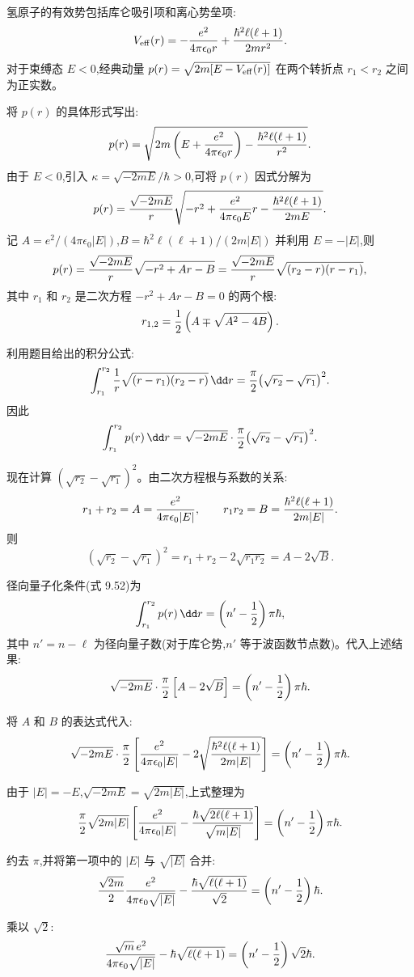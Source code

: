 \begin{solution}
氢原子的有效势包括库仑吸引项和离心势垒项:
\[
V_{\rm eff}(r)=-{e^2\over4\pi\epsilon_0 r}+{\hbar^2\ell(\ell+1)\over2mr^2}.
\]
对于束缚态 $E<0$,经典动量 $p(r)=\sqrt{2m[E-V_{\rm eff}(r)]}$ 在两个转折点 $r_1<r_2$ 之间为正实数。

将 $p(r)$ 的具体形式写出:
\[
p(r)=\sqrt{2m\left(E+{e^2\over4\pi\epsilon_0 r}\right)-{\hbar^2\ell(\ell+1)\over r^2}}.
\]
由于 $E<0$,引入 $\kappa=\sqrt{-2mE}/\hbar>0$,可将 $p(r)$ 因式分解为
\[
p(r)={\sqrt{-2mE}\over r}\sqrt{-r^2+{e^2\over4\pi\epsilon_0 E}r
-{\hbar^2\ell(\ell+1)\over2mE}}.
\]
记 $A={e^2/(4\pi\epsilon_0|E|)}$,$B={\hbar^2\ell(\ell+1)/(2m|E|)}$ 并利用 $E=-|E|$,则
\[
p(r)={\sqrt{-2mE}\over r}\sqrt{-r^2+Ar-B}
={\sqrt{-2mE}\over r}\sqrt{(r_2-r)(r-r_1)},
\]
其中 $r_1$ 和 $r_2$ 是二次方程 $-r^2+Ar-B=0$ 的两个根:
\[
r_{1,2}={1\over2}\left(A\mp\sqrt{A^2-4B}\right).
\]

利用题目给出的积分公式:
\[
\int_{r_1}^{r_2}{1\over r}\sqrt{(r-r_1)(r_2-r)}\,\dd r
={\pi\over2}\bigl(\sqrt{r_2}-\sqrt{r_1}\bigr)^2.
\]
因此
\[
\int_{r_1}^{r_2}p(r)\,\dd r
=\sqrt{-2mE}\cdot{\pi\over2}\bigl(\sqrt{r_2}-\sqrt{r_1}\bigr)^2.
\]

现在计算 $(\sqrt{r_2}-\sqrt{r_1})^2$。由二次方程根与系数的关系:
\[
r_1+r_2=A={e^2\over4\pi\epsilon_0|E|},\qquad
r_1r_2=B={\hbar^2\ell(\ell+1)\over2m|E|}.
\]
则
\[
(\sqrt{r_2}-\sqrt{r_1})^2=r_1+r_2-2\sqrt{r_1r_2}
=A-2\sqrt{B}.
\]

径向量子化条件(式 9.52)为
\[
\int_{r_1}^{r_2}p(r)\,\dd r=\left(n'-{1\over2}\right)\pi\hbar,
\]
其中 $n'=n-\ell$ 为径向量子数(对于库仑势,$n'$ 等于波函数节点数)。代入上述结果:
\[
\sqrt{-2mE}\cdot{\pi\over2}\left[A-2\sqrt{B}\right]
=\left(n'-{1\over2}\right)\pi\hbar.
\]

将 $A$ 和 $B$ 的表达式代入:
\[
\sqrt{-2mE}\cdot{\pi\over2}
\left[{e^2\over4\pi\epsilon_0|E|}-2\sqrt{\hbar^2\ell(\ell+1)\over2m|E|}\right]
=\left(n'-{1\over2}\right)\pi\hbar.
\]

由于 $|E|=-E$,$\sqrt{-2mE}=\sqrt{2m|E|}$,上式整理为
\[
{\pi\over2}\sqrt{2m|E|}
\left[{e^2\over4\pi\epsilon_0|E|}-{\hbar\sqrt{2\ell(\ell+1)}\over\sqrt{m|E|}}\right]
=\left(n'-{1\over2}\right)\pi\hbar.
\]

约去 $\pi$,并将第一项中的 $|E|$ 与 $\sqrt{|E|}$ 合并:
\[
{\sqrt{2m}\over2}{e^2\over4\pi\epsilon_0\sqrt{|E|}}
-{\hbar\sqrt{\ell(\ell+1)}\over\sqrt2}
=\left(n'-{1\over2}\right)\hbar.
\]

乘以 $\sqrt2$:
\[
{\sqrt{m}\,e^2\over4\pi\epsilon_0\sqrt{|E|}}
-\hbar\sqrt{\ell(\ell+1)}
=\left(n'-{1\over2}\right)\sqrt2\hbar.
\]


\end{solution}
